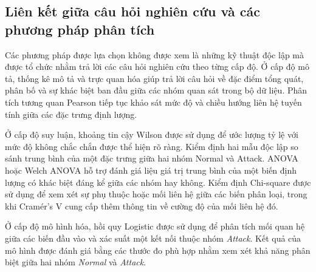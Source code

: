 \documentclass[../main.tex]{subfiles}
\begin{document}
\subsection{Liên kết giữa câu hỏi nghiên cứu và các phương pháp phân tích}

Các phương pháp được lựa chọn không được xem là những kỹ thuật độc lập mà được tổ chức nhằm trả lời các câu hỏi nghiên cứu theo từng cấp độ. Ở cấp độ mô tả, thống kê mô tả và trực quan hóa giúp trả lời câu hỏi về đặc điểm tổng quát, phân bố và sự khác biệt ban đầu giữa các nhóm quan sát trong bộ dữ liệu. Phân tích tương quan Pearson tiếp tục khảo sát mức độ và chiều hướng liên hệ tuyến tính giữa các đặc trưng định lượng.

Ở cấp độ suy luận, khoảng tin cậy Wilson được sử dụng để ước lượng tỷ lệ với mức độ không chắc chắn được thể hiện rõ ràng. Kiểm định hai mẫu độc lập so sánh trung bình của một đặc trưng giữa hai nhóm Normal và Attack. ANOVA hoặc Welch ANOVA hỗ trợ đánh giá liệu giá trị trung bình của một biến định lượng có khác biệt đáng kể giữa các nhóm hay không. Kiểm định Chi-square được sử dụng để xem xét sự phụ thuộc hoặc mối liên hệ giữa các biến phân loại, trong khi Cramér's V cung cấp thêm thông tin về cường độ của mối liên hệ đó.

Ở cấp độ mô hình hóa, hồi quy Logistic được sử dụng để phân tích mối quan hệ giữa các biến đầu vào và xác suất một kết nối thuộc nhóm \textit{Attack}. Kết quả của mô hình được đánh giá bằng các thước đo phù hợp nhằm xem xét khả năng phân biệt giữa hai nhóm \textit{Normal} và \textit{Attack}.
\end{document}
